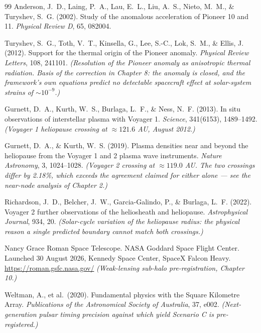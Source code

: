 \documentclass[11pt, letterpaper, openany]{book}
\begin{document}
\begin{thebibliography}{99}
Anderson, J.~D., Laing, P.~A., Lau, E.~L., Liu, A.~S., Nieto, M.~M., \& Turyshev, S.~G. (2002).
Study of the anomalous acceleration of Pioneer 10 and 11.
\textit{Physical Review D}, 65, 082004.

Turyshev, S.~G., Toth, V.~T., Kinsella, G., Lee, S.-C., Lok, S.~M., \& Ellis, J. (2012).
Support for the thermal origin of the Pioneer anomaly.
\textit{Physical Review Letters}, 108, 241101.
\textit{(Resolution of the Pioneer anomaly as anisotropic thermal radiation. Basis of the
correction in Chapter 8: the anomaly is closed, and the framework's own equations predict no
detectable spacecraft effect at solar-system strains of $\sim 10^{-9}$.)}

Gurnett, D.~A., Kurth, W.~S., Burlaga, L.~F., \& Ness, N.~F. (2013).
In situ observations of interstellar plasma with Voyager 1.
\textit{Science}, 341(6153), 1489--1492.
\textit{(Voyager 1 heliopause crossing at $\approx 121.6$ AU, August 2012.)}

Gurnett, D.~A., \& Kurth, W.~S. (2019).
Plasma densities near and beyond the heliopause from the Voyager 1 and 2 plasma wave
instruments.
\textit{Nature Astronomy}, 3, 1024--1028.
\textit{(Voyager 2 crossing at $\approx 119.0$ AU. The two crossings differ by 2.18\%, which
exceeds the agreement claimed for either alone --- see the near-node analysis of Chapter 2.)}

Richardson, J.~D., Belcher, J.~W., Garcia-Galindo, P., \& Burlaga, L.~F. (2022).
Voyager 2 further observations of the heliosheath and heliopause.
\textit{Astrophysical Journal}, 934, 20.
\textit{(Solar-cycle variation of the heliopause radius: the physical reason a single
predicted boundary cannot match both crossings.)}


Nancy Grace Roman Space Telescope. NASA Goddard Space Flight Center.
Launched 30 August 2026, Kennedy Space Center, SpaceX Falcon Heavy.
\url{https://roman.gsfc.nasa.gov/}
\textit{(Weak-lensing sub-halo pre-registration, Chapter 10.)}

Weltman, A., et al.\ (2020).
Fundamental physics with the Square Kilometre Array.
\textit{Publications of the Astronomical Society of Australia}, 37, e002.
\textit{(Next-generation pulsar timing precision against which yield Scenario C is
pre-registered.)}

\end{thebibliography}
\end{document}
